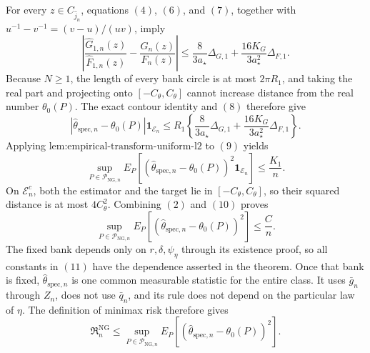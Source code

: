 For every \(z\in C_{\widehat j_n}\), equations \((4)\), \((6)\), and \((7)\), together with \(u^{-1}-v^{-1}=(v-u)/(uv)\), imply
\[
 \left|
  \frac{\widehat G_{1,n}(z)}{\widehat F_{1,n}(z)}
  -\frac{G_n(z)}{F_n(z)}
 \right|
 \le
 \frac{8}{3a_{\star}}\Delta_{G,1}
 +\frac{16K_G}{3a_{\star}^2}\Delta_{F,1}. \tag{8}
\]
Because \(N\ge1\), the length of every bank circle is at most \(2\pi R_1\), and taking the real part and projecting onto \([-C_{\theta},C_{\theta}]\) cannot increase distance from the real number \(\theta_0(P)\).  The exact contour identity and \((8)\) therefore give
\[
 |\widehat\theta_{\mathrm{spec},n}-\theta_0(P)|\mathbf 1_{\mathcal E_n}
 \le R_1\left\{
   \frac{8}{3a_{\star}}\Delta_{G,1}
   +\frac{16K_G}{3a_{\star}^2}\Delta_{F,1}
 \right\}. \tag{9}
\]
Applying \(\text{lem:empirical-transform-uniform-l2}\) to \((9)\) yields
\[
 \sup_{P\in\mathcal P_{\mathrm{NG},n}}
 E_P\!\left[(\widehat\theta_{\mathrm{spec},n}-\theta_0(P))^2
              \mathbf 1_{\mathcal E_n}\right]
 \le\frac{K_1}{n}. \tag{10}
\]
On \(\mathcal E_n^c\), both the estimator and the target lie in \([-C_{\theta},C_{\theta}]\), so their squared distance is at most \(4C_{\theta}^2\).  Combining \((2)\) and \((10)\) proves
\[
 \sup_{P\in\mathcal P_{\mathrm{NG},n}}
 E_P[(\widehat\theta_{\mathrm{spec},n}-\theta_0(P))^2]
 \le\frac Cn. \tag{11}
\]
The fixed bank depends only on \(r,\delta,\psi_{\eta}\) through its existence proof, so all constants in \((11)\) have the dependence asserted in the theorem.  Once that bank is fixed, \(\widehat\theta_{\mathrm{spec},n}\) is one common measurable statistic for the entire class.  It uses \(\bar g_n\) through \(Z_n\), does not use \(\bar q_n\), and its rule does not depend on the particular law of \(\eta\).  The definition of minimax risk therefore gives
\[
 \mathfrak R_n^{\mathrm{NG}}
 \le\sup_{P\in\mathcal P_{\mathrm{NG},n}}
 E_P[(\widehat\theta_{\mathrm{spec},n}-\theta_0(P))^2]. \tag{12}
\]

